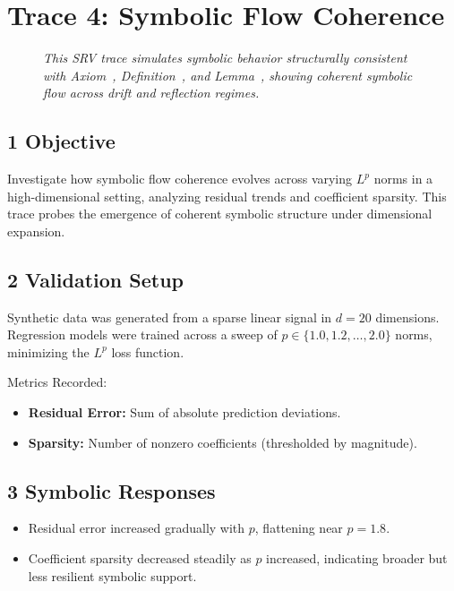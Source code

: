 \section*{Trace 4: Symbolic Flow Coherence}
\label{section:trace4_symbolic_flow_coherence}

\begin{figure}[htbp]
\centering
\caption[\textit{SRV trace (summary)}]{\textit{This SRV trace simulates symbolic behavior structurally consistent with Axiom~, Definition~, and Lemma~, showing coherent symbolic flow across drift and reflection regimes.}}
\label{figure:trace4_flow_coherence_summary}
\end{figure}

\subsection*{1 Objective}
\label{subsection:trace4_objective}

Investigate how symbolic flow coherence evolves across varying $L^p$ norms in a high-dimensional setting, analyzing residual trends and coefficient sparsity. This trace probes the emergence of coherent symbolic structure under dimensional expansion.

\subsection*{2 Validation Setup}
\label{subsection:trace4_validation_setup}

Synthetic data was generated from a sparse linear signal in $d = 20$ dimensions. Regression models were trained across a sweep of $p \in \{1.0, 1.2, \ldots, 2.0\}$ norms, minimizing the $L^p$ loss function.

Metrics Recorded:
\begin{itemize}
    \item \textbf{Residual Error:} Sum of absolute prediction deviations.
    \item \textbf{Sparsity:} Number of nonzero coefficients (thresholded by magnitude).
\end{itemize}

\subsection*{3 Symbolic Responses}
\label{subsection:trace4_symbolic_responses}

\begin{itemize}
    \item Residual error increased gradually with $p$, flattening near $p = 1.8$.
    \item Coefficient sparsity decreased steadily as $p$ increased, indicating broader but less resilient symbolic support.
\end{itemize}

